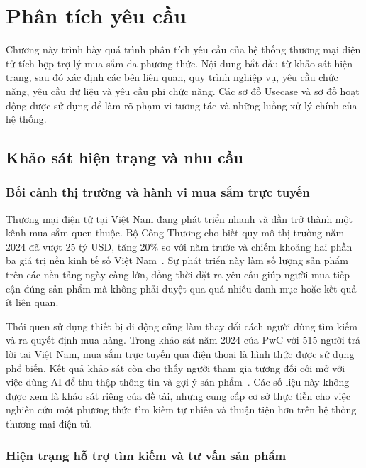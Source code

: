
\section{Phân tích yêu cầu}
\label{sec:requirements-analysis}

Chương này trình bày quá trình phân tích yêu cầu của hệ thống thương mại điện tử
tích hợp trợ lý mua sắm đa phương thức. Nội dung bắt đầu từ khảo sát hiện trạng,
sau đó xác định các bên liên quan, quy trình nghiệp vụ, yêu cầu chức năng, yêu
cầu dữ liệu và yêu cầu phi chức năng. Các sơ đồ Usecase và sơ đồ hoạt động được
sử dụng để làm rõ phạm vi tương tác và những luồng xử lý chính của hệ thống.

\subsection{Khảo sát hiện trạng và nhu cầu}

\subsubsection{Bối cảnh thị trường và hành vi mua sắm trực tuyến}

Thương mại điện tử tại Việt Nam đang phát triển nhanh và dần trở thành một kênh
mua sắm quen thuộc. Bộ Công Thương cho biết quy mô thị trường năm 2024 đã vượt
25 tỷ USD, tăng 20\% so với năm trước và chiếm khoảng hai phần ba giá trị nền kinh
tế số Việt Nam~\cite{moit2025ecommerce}. Sự phát triển này làm số lượng sản phẩm
trên các nền tảng ngày càng lớn, đồng thời đặt ra yêu cầu giúp người mua tiếp cận
đúng sản phẩm mà không phải duyệt qua quá nhiều danh mục hoặc kết quả ít liên quan.

Thói quen sử dụng thiết bị di động cũng làm thay đổi cách người dùng tìm kiếm và
ra quyết định mua hàng. Trong khảo sát năm 2024 của PwC với 515 người trả lời tại
Việt Nam, mua sắm trực tuyến qua điện thoại là hình thức được sử dụng phổ biến.
Kết quả khảo sát còn cho thấy người tham gia tương đối cởi mở với việc dùng AI để
thu thập thông tin và gợi ý sản phẩm~\cite{pwc2024voiceconsumer}. Các số liệu này
không được xem là khảo sát riêng của đề tài, nhưng cung cấp cơ sở thực tiễn cho
việc nghiên cứu một phương thức tìm kiếm tự nhiên và thuận tiện hơn trên hệ thống
thương mại điện tử.

\subsubsection{Hiện trạng hỗ trợ tìm kiếm và tư vấn sản phẩm}

